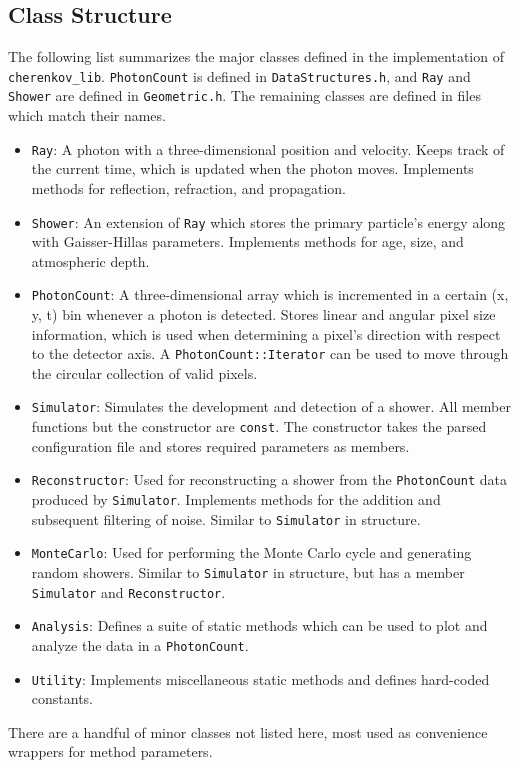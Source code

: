 \subsection{Class Structure}
The following list summarizes the major classes defined in the implementation of \texttt{cherenkov\_lib}. \texttt{PhotonCount} is defined in \texttt{DataStructures.h}, and \texttt{Ray} and \texttt{Shower} are defined in \texttt{Geometric.h}. The remaining classes are defined in files which match their names.
\begin{itemize}
    \item \texttt{Ray}: A photon with a three-dimensional position and velocity. Keeps track of the current time, which is updated when the photon moves. Implements methods for reflection, refraction, and propagation.
    \item \texttt{Shower}: An extension of \texttt{Ray} which stores the primary particle's energy along with Gaisser-Hillas parameters. Implements methods for age, size, and atmospheric depth.
    \item \texttt{PhotonCount}: A three-dimensional array which is incremented in a certain (x, y, t) bin whenever a photon is detected. Stores linear and angular pixel size information, which is used when determining a pixel's direction with respect to the detector axis. A \texttt{PhotonCount::Iterator} can be used to move through the circular collection of valid pixels.
    \item \texttt{Simulator}: Simulates the development and detection of a shower. All member functions but the constructor are \texttt{const}. The constructor takes the parsed configuration file and stores required parameters as members.
    \item \texttt{Reconstructor}: Used for reconstructing a shower from the \texttt{PhotonCount} data produced by \texttt{Simulator}. Implements methods for the addition and subsequent filtering of noise. Similar to \texttt{Simulator} in structure.
    \item \texttt{MonteCarlo}: Used for performing the Monte Carlo cycle and generating random showers. Similar to \texttt{Simulator} in structure, but has a member \texttt{Simulator} and \texttt{Reconstructor}.
    \item \texttt{Analysis}: Defines a suite of static methods which can be used to plot and analyze the data in a \texttt{PhotonCount}.
    \item \texttt{Utility}: Implements miscellaneous static methods and defines hard-coded constants.
\end{itemize}
There are a handful of minor classes not listed here, most used as convenience wrappers for method parameters.

